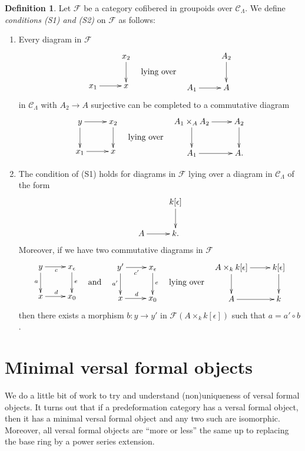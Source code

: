 \documentclass{amsart}
\theoremstyle{plain}
\theoremstyle{definition}
\newtheorem{definition}[subsection]{Definition}
\theoremstyle{remark}
\numberwithin{equation}{subsection}
\begin{document}
\begin{definition}
\label{definition-S1-S2}
Let $\mathcal{F}$ be a category cofibered in groupoids over $\mathcal
C_\Lambda$. We define {\it conditions (S1) and (S2)}
on $\mathcal{F}$ as follows:
\begin{enumerate}
\item[(S1)] Every diagram in $\mathcal{F}$
$$
\vcenter{
\xymatrix{
           & x_2 \ar[d] \\
x_1 \ar[r] & x
}
}
\quad\text{lying over}\quad
\vcenter{
\xymatrix{
           & A_2 \ar[d] \\
A_1 \ar[r] & A
}
}
$$
in $\mathcal{C}_\Lambda$ with $A_2 \to A$ surjective can be completed
to a commutative diagram
$$
\vcenter{
\xymatrix{
y \ar[r] \ar[d] & x_2 \ar[d] \\
x_1 \ar[r]      & x
}
}
\quad\text{lying over}\quad
\vcenter{
\xymatrix{
A_1 \times_A A_2 \ar[r] \ar[d] & A_2 \ar[d] \\
A_1 \ar[r]      & A.
}
}
$$
\item[(S2)]
The condition of (S1) holds for diagrams in $\mathcal{F}$ lying over
a diagram in $\mathcal{C}_\Lambda$ of the form
$$
\xymatrix{
          & k[\epsilon] \ar[d] \\
A  \ar[r] & k.
}
$$
Moreover, if we have two commutative diagrams in $\mathcal{F}$
$$
\vcenter{
\xymatrix{
y \ar[r]_c \ar[d]_a & x_\epsilon \ar[d]^e \\
x \ar[r]^d          & x_0
}
}
\quad\text{and}\quad
\vcenter{
\xymatrix{
y' \ar[r]_{c'} \ar[d]_{a'} & x_\epsilon \ar[d]^e \\
x \ar[r]^d                 & x_0
}
}
\quad\text{lying over}\quad
\vcenter{
\xymatrix{
A \times_k k[\epsilon] \ar[r] \ar[d] & k[\epsilon] \ar[d] \\
A  \ar[r] & k
}
}
$$
then there exists a morphism $b : y \to y'$ in
$\mathcal{F}(A \times_k k[\epsilon])$ such that $a = a' \circ b$.
\end{enumerate}
\end{definition}

\section{Minimal versal formal objects}
\label{section-minimal-versal}

\noindent
We do a little bit of work to try and understand (non)uniqueness
of versal formal objects. It turns out that if a predeformation category
has a versal formal object, then it has a minimal versal formal
object and any two such are isomorphic. Moreover, all versal formal
objects are ``more or less'' the same up to replacing the base ring
by a power series extension.
\end{document}
